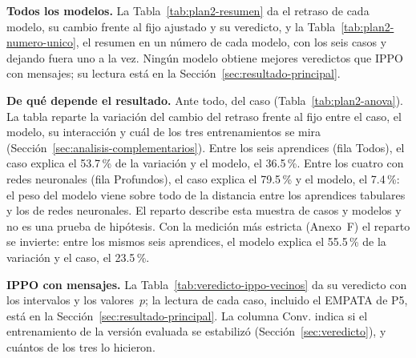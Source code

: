 \noindent\textbf{Todos los modelos.} La Tabla~\ref{tab:plan2-resumen}
da el retraso de cada modelo, su cambio frente al fijo ajustado y su
veredicto, y la Tabla~\ref{tab:plan2-numero-unico}, el resumen en un
número de cada modelo, con los seis casos y dejando fuera uno a la vez.
Ningún modelo obtiene mejores veredictos que IPPO con mensajes; su
lectura está en la Sección~\ref{sec:resultado-principal}.


\noindent\textbf{De qué depende el resultado.} Ante todo, del caso
(Tabla~\ref{tab:plan2-anova}). La tabla reparte la variación del cambio
del retraso frente al fijo entre el caso, el modelo, su interacción y
cuál de los tres entrenamientos se mira
(Sección~\ref{sec:analisis-complementarios}). Entre los seis
aprendices (fila Todos), el caso explica el 53.7\,\% de la variación y
el modelo, el 36.5\,\%. Entre los cuatro con redes neuronales (fila
Profundos), el caso explica el 79.5\,\% y el modelo, el 7.4\,\%: el
peso del modelo viene sobre todo de la distancia entre los aprendices
tabulares y los de redes neuronales. El reparto describe esta muestra
de casos y modelos y no es una prueba de hipótesis. Con la medición más
estricta (Anexo~F) el reparto se invierte: entre los mismos seis
aprendices, el modelo explica el 55.5\,\% de la variación y el caso, el
23.5\,\%.



\noindent\textbf{IPPO con mensajes.} La
Tabla~\ref{tab:veredicto-ippo-vecinos} da su veredicto con los
intervalos y los valores~$p$; la lectura de cada caso, incluido el
EMPATA de P5, está en la Sección~\ref{sec:resultado-principal}. La
columna Conv. indica si el entrenamiento de la versión evaluada se
estabilizó (Sección~\ref{sec:veredicto}), y
cuántos de los tres lo hicieron.


